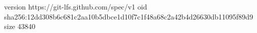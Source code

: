 version https://git-lfs.github.com/spec/v1
oid sha256:12dd308b6c681c2aa10b5dbce1d10f7c1f48a68c2a42b4d26630db11095f89d9
size 43840

